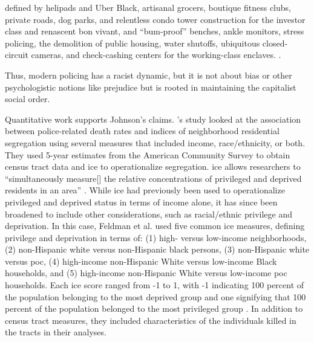 \documentclass[12pt]{article}
\renewenvironment{quote}
  {\list{}{\leftmargin=\parindent\rightmargin=0pt}%
   \item\relax}
  {\endlist}
\begin{document}
\begin{quote}
defined by helipads and Uber Black, artisanal grocers, boutique fitness clubs, private roads, dog parks, and relentless condo tower construction for the investor class and renascent bon vivant, and “bum-proof” benches, ankle monitors, stress policing, the demolition of public housing, water shutoffs, ubiquitous closed-circuit cameras, and check-cashing centers for the working-class enclaves. \parencite[178]{johnsonTrumpismPolicingProblem2019}.
\end{quote}

Thus, modern policing has a racist dynamic, but it is not about bias or other psychologistic notions like prejudice but is rooted in maintaining the capitalist social order. 


Quantitative work supports Johnson’s claims. \citeauthor{feldmanPoliceRelatedDeathsNeighborhood2019}'s \parencite*{feldmanPoliceRelatedDeathsNeighborhood2019} study looked at the association between police-related death rates and indices of neighborhood residential segregation using several measures that included income, race/ethnicity, or both. They used 5-year estimates from the American Community Survey to obtain census tract data and \acrfull{ice} to operationalize segregation. \acrshort{ice} allows researchers to “simultaneously measure[] the relative concentrations of privileged and deprived residents in an area” \parencite[459]{feldmanPoliceRelatedDeathsNeighborhood2019}. While \acrshort{ice} had previously been used to operationalize privileged and deprived status in terms of income alone, it has since been broadened to include other considerations, such as racial/ethnic privilege and deprivation. In this case, Feldman et al. used five common \acrshort{ice} measures, defining privilege and deprivation in terms of: (1) high- versus low-income neighborhoods, (2) non-Hispanic white versus non-Hispanic black persons, (3) non-Hispanic white versus \acrfull{poc}, (4) high-income non-Hispanic White versus low-income Black households, and (5) high-income non-Hispanic White versus low-income \acrshort{poc} households. Each \acrshort{ice} score ranged from -1 to 1, with -1 indicating 100 percent of the population belonging to the most deprived group and one signifying that 100 percent of the population belonged to the most privileged group \parencite[459]{feldmanPoliceRelatedDeathsNeighborhood2019}. In addition to census tract measures, they included characteristics of the individuals killed in the tracts in their analyses.
\end{document}
